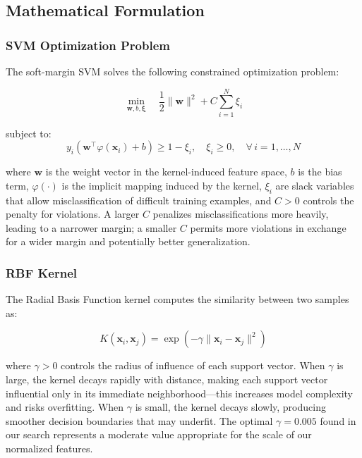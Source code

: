 \documentclass[12pt,a4paper]{article}
\begin{document}
\subsection{Mathematical Formulation}

\subsubsection{SVM Optimization Problem}

The soft-margin SVM solves the following constrained optimization problem:

\begin{equation}
\min_{\mathbf{w}, b, \boldsymbol{\xi}} \quad \frac{1}{2}\|\mathbf{w}\|^2 + C \sum_{i=1}^{N} \xi_i
\label{eq:svm_primal}
\end{equation}

subject to:
\begin{equation}
y_i\left(\mathbf{w}^\top \varphi(\mathbf{x}_i) + b\right) \geq 1 - \xi_i, \quad \xi_i \geq 0, \quad \forall\, i = 1, \ldots, N
\label{eq:svm_constraints}
\end{equation}

where $\mathbf{w}$ is the weight vector in the kernel-induced feature space, $b$ is the bias term, $\varphi(\cdot)$ is the implicit mapping induced by the kernel, $\xi_i$ are slack variables that allow misclassification of difficult training examples, and $C > 0$ controls the penalty for violations. A larger $C$ penalizes misclassifications more heavily, leading to a narrower margin; a smaller $C$ permits more violations in exchange for a wider margin and potentially better generalization.

\subsubsection{RBF Kernel}

The Radial Basis Function kernel computes the similarity between two samples as:

\begin{equation}
K(\mathbf{x}_i, \mathbf{x}_j) = \exp\left(-\gamma \|\mathbf{x}_i - \mathbf{x}_j\|^2\right)
\label{eq:rbf}
\end{equation}

where $\gamma > 0$ controls the radius of influence of each support vector. When $\gamma$ is large, the kernel decays rapidly with distance, making each support vector influential only in its immediate neighborhood---this increases model complexity and risks overfitting. When $\gamma$ is small, the kernel decays slowly, producing smoother decision boundaries that may underfit. The optimal $\gamma = 0.005$ found in our search represents a moderate value appropriate for the scale of our normalized features.
\end{document}
